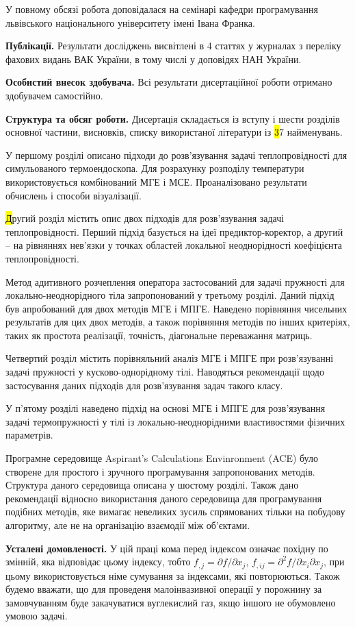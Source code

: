 У повному обсязі робота доповідалася на семінарі кафедри програмування львівського національного університету імені
Івана Франка.

\textbf{Публікації.} Результати досліджень висвітлені в 4 статтях у журналах з переліку фахових видань ВАК України, в
тому числі у доповідях НАН України.

\textbf{Особистий внесок здобувача.} Всі результати дисертаційної роботи отримано здобувачем самостійно.

\textbf{Структура та обсяг роботи.} Дисертація складається із вступу і шести розділів основної частини, висновків,
списку використаної літератури із {\hl 37} найменувань.

У першому розділі описано підходи до розв'язування задачі теплопровідності для симульованого термоендоскопа. Для 
розрахунку розподілу температури використовується комбінований МГЕ і МСЕ. Проаналізовано результати обчислень і способи
візуалізації.

{\hl Другий розділ містить опис двох підходів для розв'язування задачі теплопровідності. Перший підхід базується на ідеї
предиктор-коректор, а другий -- на рівняннях нев'язки у точках областей локальної неоднорідності коефіцієнта
теплопровідності.

Метод адитивного розчеплення оператора застосований для задачі пружності для локально-неоднорідного тіла запропонований
у третьому розділі. Даний підхід був апробований для двох методів МГЕ і МПГЕ. Наведено порівняння чисельних результатів
для цих двох методів, а також порівняння методів по інших критеріях, таких як простота реалізації, точність, діагональне
переважання матриць.

Четвертий розділ містить порівняльний аналіз МГЕ і МПГЕ при розв'язуванні задачі пружності у кусково-однорідному тілі.
Наводяться рекомендації щодо застосування даних підходів для розв'язування задач такого класу.

У п'ятому розділі наведено підхід на основі МГЕ і МПГЕ для розв'язування задачі термопружності у тілі із
локально-неоднорідними властивостями фізичних параметрів.}

Програмне середовище Aspirant's Calculations Envinronment (ACE) було створене для простого і зручного програмування
запропонованих методів. Структура даного середовища описана у шостому розділі. Також дано рекомендації відносно
використання даного середовища для програмування подібних методів, яке вимагає невеликих зусиль спрямованих тільки на
побудову алгоритму, але не на організацію взаємодії між об'єктами.

\textbf{Усталені домовленості.} У цій праці кома перед індексом означає похідну по змінній, яка відповідає цьому
індексу, тобто ${f_{,j} = \partial}{f/\partial}x_{j}$, ${{f_{,ij} = \partial^{2}}{f/\partial}x_{i}\partial x_{j}}{}$,
при цьому викори­стовується німе сумування за індек­сами, які повторюються. Також будемо вважати, що для проведеня 
малоінвазивної операції у порожнину за замовчуванням буде закачуватися вуглекислий газ, якщо іншого не обумовлено умовою
задачі. 
